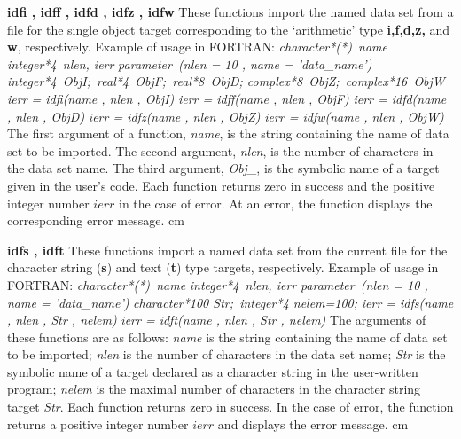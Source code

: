 {
{\bf idfi , idff , idfd , idfz , idfw}\hfil\break
These functions import the named data set from a file 
for the single object target 
corresponding to the `arithmetic' type {\bf i,f,d,z,} and {\bf w}, 
respectively. 
Example of usage in FORTRAN:\hfil\break
{\it character*(*)\ name}\hfil\break
{\it integer*4\ nlen, ierr}\hfil\break
{\it parameter\ (nlen = 10 , name = 'data\_name')}\hfil\break
{\it integer*4\ ObjI;\ real*4\ ObjF;\ real*8\ ObjD;
complex*8\ ObjZ;\ complex*16\ ObjW}\hfil\break
{\it ierr = idfi(name , nlen , ObjI)}\hfil\break
{\it ierr = idff(name , nlen , ObjF)}\hfil\break
{\it ierr = idfd(name , nlen , ObjD)}\hfil\break
{\it ierr = idfz(name , nlen , ObjZ)}\hfil\break
{\it ierr = idfw(name , nlen , ObjW)}\hfil\break
The first argument of a function, {\it name}, is the string containing 
the name of data set to be imported.
The second argument, {\it nlen}, is the number of characters 
in the data set name.
The third argument, {\it Obj\_},
is the symbolic name of a target given in the user's code.
Each function returns zero in success
and the positive integer number $ierr$ in the case of error.
At an error,  the function displays the corresponding error message.
}
 cm

{
{\bf idfs , idft}\hfil\break
These functions import a named data set from the current file 
for the character string ({\bf s}) and text ({\bf t}) type targets, 
respectively. 
Example of usage in FORTRAN:\hfil\break
{\it character*(*)\ name}\hfil\break
{\it integer*4\ nlen, ierr}\hfil\break
{\it parameter\ (nlen = 10 , name = 'data\_name')}\hfil\break
{\it character*100 Str;\ integer*4 nelem=100;}\hfil\break
{\it ierr = idfs(name , nlen , Str , nelem)}\hfil\break
{\it ierr = idft(name , nlen , Str , nelem)}\hfil\break
The arguments of these functions are as follows: 
{\it name} is the string containing the name of data set to be imported;
{\it nlen} is the number of characters in the data set name;
{\it Str} is the symbolic name of a target declared as a character string
in the user-written program;
{\it nelem} is the maximal number of characters in the character string target
{\it Str}.
Each function returns zero in success.
In the case of error, the function returns a positive integer number $ierr$
and displays the error message. 
}
 cm

